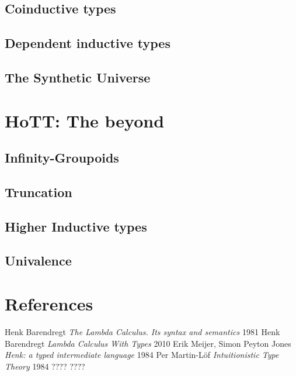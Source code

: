 \documentclass[11pt,oneside]{article}
\begin{document}
\subsection{Coinductive types}
\subsection{Dependent inductive types}
\subsection{The Synthetic Universe}

\section{HoTT: The beyond}
\subsection{Infinity-Groupoids}
\subsection{Truncation}
\subsection{Higher Inductive types}
\subsection{Univalence}

\newpage
\section{References}
\begin{thebibliography}{9}

      Henk Barendregt \textit{The Lambda Calculus. Its syntax and semantics} 1981
      Henk Barendregt \textit{Lambda Calculus With Types} 2010
       Erik Meijer, Simon Peyton Jones \textit{Henk: a typed intermediate language} 1984
        Per Martin-Löf \textit{Intuitionistic Type Theory} 1984
 ????
 ????

\end{thebibliography}
\end{document}
